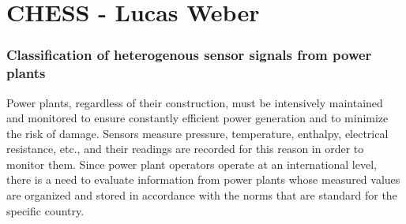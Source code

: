 \section{CHESS - Lucas Weber}


\begin{frame}
	\frametitle{Classification of heterogenous sensor signals from power plants}
	Power plants, regardless of their construction, must be intensively maintained and monitored to ensure constantly efficient power generation and to minimize the risk of damage. Sensors measure pressure, temperature, enthalpy, electrical resistance, etc., and their readings are recorded for this reason in order to monitor them. Since power plant operators operate at an international level, there is a need to evaluate information from power plants whose measured values are organized and stored in accordance with the norms that are standard for the specific country.
\end{frame}
